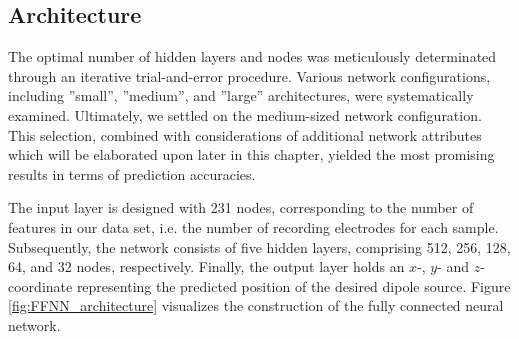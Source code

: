 \documentclass[a4paper, UKenglish, 11pt]{uiomaster}
\begin{document}
\subsection{Architecture}



The optimal number of hidden layers and nodes was meticulously determinated through an iterative trial-and-error procedure. Various network configurations, including ''small'', ''medium'', and ''large'' architectures, were systematically examined. Ultimately, we settled on the medium-sized network configuration. This selection, combined with considerations of additional network attributes which will be elaborated upon later in this chapter, yielded the most promising results in terms of prediction accuracies.

The input layer is designed with 231 nodes, corresponding to the number of features in our data set, i.e. the number of recording electrodes for each sample. Subsequently, the network consists of five hidden layers, comprising 512, 256, 128, 64, and 32 nodes, respectively. Finally, the output layer holds an $x$-, $y$- and $z$-coordinate representing the predicted position of the desired dipole source. Figure \ref{fig:FFNN_architecture} visualizes the construction of the fully connected neural network.
\end{document}
